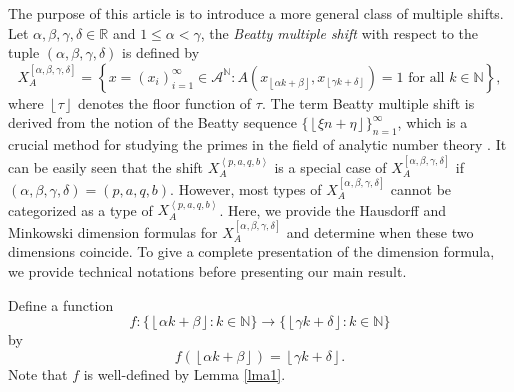 \documentclass{amsart}
\theoremstyle{definition}
\numberwithin{equation}{section}%
\begin{document}
The purpose of this article is to introduce a more general class of multiple shifts. Let $\alpha, \beta, \gamma, \delta \in \mathbb{R}$ and $1\leq \alpha <\gamma $, the \emph{Beatty multiple shift} with respect to the tuple $\left( \alpha
,\beta ,\gamma ,\delta \right)$ is defined by
\[
X_{A}^{\left[ \alpha ,\beta ,\gamma ,\delta \right] }=\left\{
x=(x_{i})_{i=1}^{\infty }\in \mathcal{A}^{\mathbb{N}}:A(x_{\left\lfloor
\alpha k+\beta \right\rfloor },x_{\left\lfloor \gamma k+\delta \right\rfloor
})=1\text{ for all }k\in \mathbb{N}\right\},
\]
where $\left\lfloor \tau \right\rfloor $ denotes the floor function of $\tau$. The term Beatty multiple shift is derived from the notion of the Beatty sequence $\{\left\lfloor \xi n+\eta \right\rfloor \}_{n=1}^\infty$, which is a crucial method for studying the primes in the field of analytic number theory \cite{kuipers2012uniform}. It can be easily seen that the shift $X_{A}^{\left\langle p,a,q,b\right\rangle }$ is a special case of $X_{A}^{\left[ \alpha ,\beta ,\gamma ,\delta \right] }$ if $(\alpha ,\beta ,\gamma,\delta )=(p,a,q,b)$. However, most types of $X_{A}^{\left[\alpha, \beta, \gamma, \delta \right] }$ cannot be categorized as a
type of $X_{A}^{\left\langle p,a,q,b\right\rangle }$. Here, we provide the Hausdorff and Minkowski dimension formulas for $X_{A}^{\left[ \alpha ,\beta ,\gamma ,\delta \right] }$ and determine when these two dimensions coincide. To give a complete presentation of the dimension formula, we provide technical notations before presenting our main result.

Define a function 
\[f:\{ \left\lfloor \alpha k+\beta \right\rfloor :k\in \mathbb{N}\}\to \{ \left\lfloor \gamma k+\delta \right\rfloor :k\in \mathbb{N}\}
\]
by 
\begin{equation}\label{iteration}
  f(\left\lfloor \alpha k+\beta \right\rfloor )=\left\lfloor \gamma k+\delta
\right\rfloor.  
\end{equation}
Note that $f$ is well-defined by Lemma \ref{lma1}. 
\end{document}
